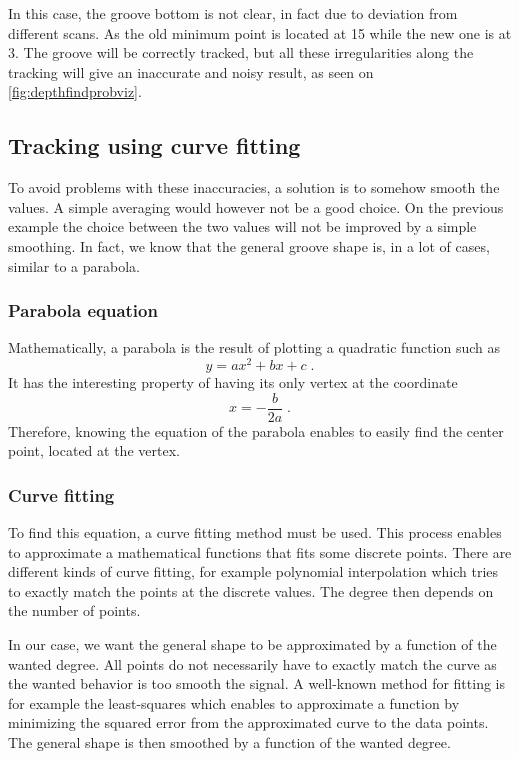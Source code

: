 In this case, the groove bottom is not clear, in fact due to deviation from different scans. As the old minimum point is located at 15 while the new one is at 3. The groove will be correctly tracked, but all these irregularities along the tracking will give an inaccurate and noisy result, as seen on \autoref{fig:depthfindprobviz}.

\subsection{Tracking using curve fitting}
\label{sec:trackfit}

To avoid problems with these inaccuracies, a solution is to somehow smooth the values. A simple averaging would however not be a good choice. On the previous example the choice between the two values will not be improved by a simple smoothing. In fact, we know that the general groove shape is, in a lot of cases, similar to a parabola.

\subsubsection{Parabola equation}

Mathematically, a parabola is the result of plotting a quadratic function such as
\begin{equation}
y = ax^2 + bx + c \; .
\end{equation}
It has the interesting property of having its only vertex at the coordinate
\begin{equation}
\label{eq:paravertex}
x = -\frac{b}{2a} \; .
\end{equation}
Therefore, knowing the equation of the parabola enables to easily find the center point, located at the vertex.

\subsubsection{Curve fitting}

To find this equation, a curve fitting method must be used. This process enables to approximate a mathematical functions that fits some discrete points. There are different kinds of curve fitting, for example polynomial interpolation which tries to exactly match the points at the discrete values. The degree then depends on the number of points.

In our case, we want the general shape to be approximated by a function of the wanted degree. All points do not necessarily have to exactly match the curve as the wanted behavior is too smooth the signal. A well-known method for fitting is for example the least-squares which enables to approximate a function by minimizing the squared error from the approximated curve to the data points. The general shape is then smoothed by a function of the wanted degree.

